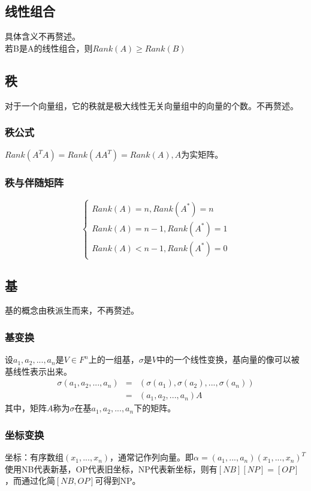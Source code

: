 \documentclass[UTF8]{ctexart}
\begin{document}
\subsection{线性组合}
具体含义不再赘述。\\
\indent
若B是A的线性组合，则$Rank(A)\geq Rank(B)$
\subsection{秩}
对于一个向量组，它的秩就是极大线性无关向量组中的向量的个数。不再赘述。
\subsubsection{秩公式}
$Rank(A^{T}A)=Rank(AA^{T})=Rank(A),A$为实矩阵。
\subsubsection{秩与伴随矩阵}
\begin{equation*}
    \left\{
        \begin{array}{c}
            Rank(A)=n,Rank(A^{*})=n\\
            Rank(A)=n-1,Rank(A^{*})=1\\
            Rank(A)<n-1,Rank(A^{*})=0
        \end{array}
    \right.
\end{equation*}
\subsection{基}
基的概念由秩派生而来，不再赘述。
\subsubsection{基变换}
设$a_1,a_2,...,a_n$是$V \in F^{n}$上的一组基，$\sigma$是$V$中的一个线性变换，基向量的像可以被基线性表示出来。
\begin{eqnarray*}
    \sigma(a_1,a_2,...,a_n) & = & (\sigma(a_1),\sigma(a_2),...,\sigma(a_n))    \\
    & = &(a_1,a_2,...,a_n)A
\end{eqnarray*}
其中，矩阵$A$称为$\sigma$在基$a_1,a_2,...,a_n$下的矩阵。
\subsubsection{坐标变换}
坐标：有序数组$(x_1,...,x_n)$，通常记作列向量。即$\alpha=(a_1,...,a_n)(x_1,...,x_n)^T$\\
\indent
使用NB代表新基，OP代表旧坐标，NP代表新坐标，则有$[NB][NP]=[OP]$，而通过化简$[NB,OP]$可得到NP。
\end{document}
